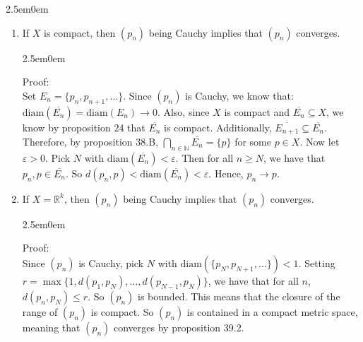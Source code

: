 \documentclass{book}
\newcommand{\hThree}{%
   \color{PineGreen}
   \fontsize{13}{15}\selectfont%
}
\newenvironment{myIndent}{%
   \begin{adjustwidth}{2.5em}{0em}%
}{%
   \end{adjustwidth}%
}
\newcommand{\retTwo}{\hfill\bigbreak}
\newcommand{\diam}[1]{\mathrm{diam}(#1)}
\begin{document}
{\begin{myIndent}
\begin{enumerate}
         {\begin{myIndent} \hThree
            Proof:\\
            Assume that $p_n \rightarrow p$. Let $\varepsilon > 0$. Pick $N$ with $\forall n \geq N$, $d(p_n, p) < \sfrac{\varepsilon}{2}$. Then for all $n, m \geq N$, $d(p_n, p_m) \leq d(p_n, p) + d(q_n, q) < \sfrac{\varepsilon}{2} + \sfrac{\varepsilon}{2} = \varepsilon$.
            \retTwo
         \end{myIndent}}

         \item If $X$ is compact, then $(p_n)$ being Cauchy implies that $(p_n)$ converges.
         
         {\begin{myIndent} \hThree
            Proof:\\
            Set $E_n = \{p_n, p_{n+1}, \ldots\}$. Since $(p_n)$ is Cauchy, we know that:\\ $\diam{\overbar{E_n}} = \diam{E_n} \rightarrow 0$. Also, since $X$ is compact and $\overbar{E_n} \subseteq X$,  we know by proposition 24 that $\overbar{E_n}$ is compact. Additionally, $\overbar{E_{n+1}} \subseteq \overbar{E_n}$.
            \retTwo
            Therefore, by proposition 38.B, ${\displaystyle \bigcap\limits_{n\in\mathbb{N}}{\overbar{E_n}}} = \{p\}$ for some $p \in X$. \retTwo
            Now let $\varepsilon > 0$. Pick $N$ with $\diam{\overbar{E_n}} < \varepsilon$. Then for all $n \geq N$, we have that $p_n, p \in \overbar{E_n}$. So $d(p_n, p) < \diam{\overbar{E_n}} < \varepsilon$. Hence, $p_n \rightarrow p$.
            \retTwo
         \end{myIndent}}

         \newpage

         \item If $X = \mathbb{R}^k$, then $(p_n)$ being Cauchy implies that $(p_n)$ converges.
         
         {\begin{myIndent} \hThree
            Proof:\\
            Since $(p_n)$ is Cauchy, pick $N$ with $\diam{\{p_N, p_{N+1}, \ldots\}} < 1$. Setting\\ $r = \max\{1, d(p_1, p_N), \ldots, d(p_{N-1}, p_N)\}$, we have that for all $n$,\\ $d(p_n, p_N) \leq r$. So $(p_n)$ is bounded. This means that the closure of the range of $(p_n)$ is compact. So $(p_n)$ is contained in a compact metric space, meaning that $(p_n)$ converges by proposition 39.2.
            \retTwo
         \end{myIndent}}
      \end{enumerate}
   \end{myIndent}}
\end{document}
